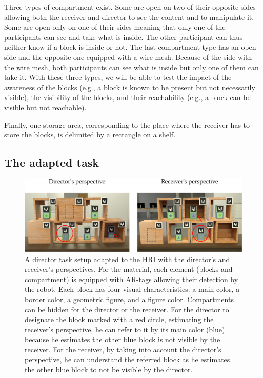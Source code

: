 Three types of compartment exist. Some are open on two of their opposite sides allowing both the receiver and director to see the content and to manipulate it. Some are open only on one of their sides meaning that only one of the participants can see and take what is inside. The other participant can thus neither know if a block is inside or not. The last compartment type has an open side and the opposite one equipped with a wire mesh. Because of the side with the wire mesh, both participants can see what is inside but only one of them can take it. With these three types, we will be able to test the impact of the awareness of the blocks (e.g., a block is known to be present but not necessarily visible), the visibility of the blocks, and their reachability (e.g., a block can be visible but not reachable).

Finally, one storage area, corresponding to the place where the receiver has to store the blocks, is delimited by a rectangle on a shelf.

\subsection{The adapted task}

\begin{figure}[ht!]
\centering
\includegraphics[width=\textwidth]{figures/chapter9/setup.png}
\caption{\label{fig:chap9_setup} A director task setup adapted to the HRI with the director's and receiver's perspectives. For the material, each element (blocks and compartment) is equipped with AR-tags allowing their detection by the robot. Each block has four visual characteristics: a main color, a border color, a geometric figure, and a figure color. Compartments can be hidden for the director or the receiver. For the director to designate the block marked with a red circle, estimating the receiver's perspective, he can refer to it by its main color (blue) because he estimates the other blue block is not visible by the receiver. For the receiver, by taking into account the director's perspective, he can understand the referred block as he estimates the other blue block to not be visible by the director.}
\end{figure}

